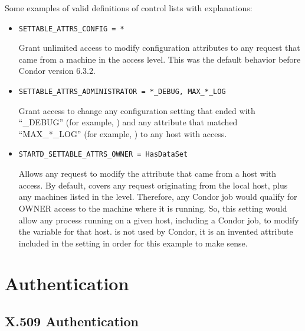 Some examples of valid definitions of control lists with explanations:

\begin{itemize}

\item \begin{verbatim}SETTABLE_ATTRS_CONFIG = *\end{verbatim}
Grant unlimited access to modify configuration attributes
to any request that came from a machine in the  access
level. 
This was the default behavior before Condor version 6.3.2.

\item \begin{verbatim}SETTABLE_ATTRS_ADMINISTRATOR = *_DEBUG, MAX_*_LOG\end{verbatim} 
Grant access to change any configuration setting that ended
with ``\_DEBUG'' (for example, ) and any
attribute that matched ``MAX\_*\_LOG'' (for example,
) to any host with 
access. 

\item \begin{verbatim}STARTD_SETTABLE_ATTRS_OWNER = HasDataSet\end{verbatim}
Allows any request to modify the  
attribute that came from a host with  access.
By default,  covers any request originating from the
local host, plus any machines listed in the 
level.
Therefore, any Condor job would qualify for OWNER access to the
machine where it is running. 
So, this setting would allow any process running on a given host,
including a Condor job, to modify the  variable for
that host. 
 is not used by Condor, it is an invented attribute
included in the  setting in order for this
example to make sense.

\end{itemize}


\section{\label{sec:Authentication} Authentication} 
\Todo

\subsection{\label{sec:X509-Authentication}X.509 Authentication}
\Todo

